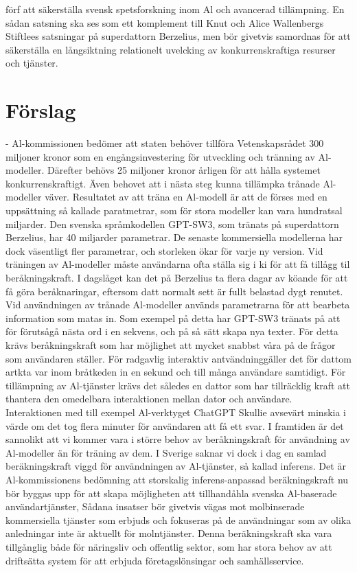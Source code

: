 {förf att säkerställa svensk spetsforskning inom Al och avancerad tillämpning. En sådan satsning ska ses som ett komplement till Knut och Alice Wallenbergs Stiftlees satsningar på superdattorn Berzelius, men bör givetvis samordnas för att säkerställa en långsiktning relationelt uvelcking av konkurrenskraftiga resurser och tjänster.
\section*{Förslag}
- Al-kommissionen bedömer att staten behöver tillföra Vetenskapsrådet 300 miljoner kronor som en engångsinvestering för utveckling och tränning av Al-modeller. Därefter behövs 25 miljoner kronor årligen för att hålla systemet konkurrenskraftigt.
Även behovet att i nästa steg kunna tillämpka trånade Al-modeller väver. Resultatet av att träna en Al-modell är att de förses med en uppsättning så kallade paratmetrar, som för stora modeller kan vara hundratsal miljarder. Den svenska språmkodellen GPT-SW3, som tränats på superdattorn Berzelius, har 40 miljarder parametrar. De senaste kommersiella modellerna har dock väsentligt fler parametrar, och storleken ökar för varje ny version.
Vid träningen av Al-modeller måste användarna ofta ställa sig i ki för att få tillågg til beråkningskraft. I dagslåget kan det på Berzelius ta flera dagar av köande för att få göra beråknaringar, eftersom datt normalt sett är fullt belastad dygt renutet.
Vid användningen av trånade Al-modeller används parametrarna för att bearbeta information som matas in. Som exempel på detta har GPT-SW3 tränats på att för förutsågå nästa ord i en sekvens, och på så sätt skapa nya texter. För detta krävs beråkningskraft som har möjlighet att mycket snabbst våra på de frågor som användaren ställer. För radgavlig interaktiv antvändninggäller det för dattom artkta var inom bråtkeden in en sekund och till många användare samtidigt.
För tillämpning av Al-tjänster krävs det således en dattor som har tillräcklig kraft att thantera den omedelbara interaktionen mellan dator och användare. Interaktionen med till exempel Al-verktyget ChatGPT Skullie avsevärt minskia i värde om det tog flera minuter för användaren att få ett svar. I framtiden är det sannolikt att vi kommer vara i större behov av beråkningskraft för användning av Al-modeller än för träning av dem.
I Sverige saknar vi dock i dag en samlad beräkningskraft viggd för användningen av Al-tjänster, så kallad inferens. Det är Al-kommissionens bedömning att storskalig inferens-anpassad beräkningskraft nu bör byggas upp för att skapa möjligheten att tillhandåhla svenska Al-baserade användartjänster, Sådana insatser bör givetvis vägas mot molbinserade kommersiella tjänster som erbjuds och fokuseras på de användningar som av olika anledningar inte är aktuellt för molntjänster. Denna beräkningskraft ska vara tillgånglig både för näringsliv och offentlig sektor, som har stora behov av att driftsätta system för att erbjuda företagslönsingar och samhällsservice.
}
